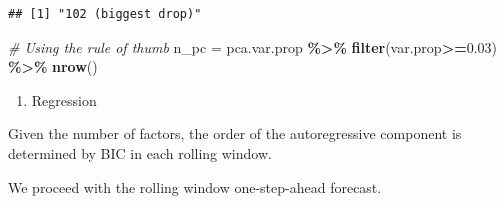 \documentclass[
]{article}
\newenvironment{Shaded}{\begin{snugshade}}{\end{snugshade}}
\newcommand{\AttributeTok}[1]{\textcolor[rgb]{0.13,0.29,0.53}{#1}}
\newcommand{\CommentTok}[1]{\textcolor[rgb]{0.56,0.35,0.01}{\textit{#1}}}
\newcommand{\DecValTok}[1]{\textcolor[rgb]{0.00,0.00,0.81}{#1}}
\newcommand{\FloatTok}[1]{\textcolor[rgb]{0.00,0.00,0.81}{#1}}
\newcommand{\FunctionTok}[1]{\textcolor[rgb]{0.13,0.29,0.53}{\textbf{#1}}}
\newcommand{\NormalTok}[1]{#1}
\newcommand{\OtherTok}[1]{\textcolor[rgb]{0.56,0.35,0.01}{#1}}
\newcommand{\SpecialCharTok}[1]{\textcolor[rgb]{0.81,0.36,0.00}{\textbf{#1}}}
\newcommand{\StringTok}[1]{\textcolor[rgb]{0.31,0.60,0.02}{#1}}
\providecommand{\tightlist}{%
  \setlength{\itemsep}{0pt}\setlength{\parskip}{0pt}}
\begin{document}
\begin{verbatim}
## [1] "102 (biggest drop)"
\end{verbatim}

\begin{Shaded}
\begin{Highlighting}[]
\CommentTok{\# Using the rule of thumb}
\NormalTok{n\_pc }\OtherTok{=}\NormalTok{ pca.var.prop }\SpecialCharTok{\%\textgreater{}\%}
  \FunctionTok{filter}\NormalTok{(var.prop}\SpecialCharTok{\textgreater{}=}\FloatTok{0.03}\NormalTok{) }\SpecialCharTok{\%\textgreater{}\%}
  \FunctionTok{nrow}\NormalTok{()}
\end{Highlighting}
\end{Shaded}

\begin{enumerate}
\def\labelenumi{\arabic{enumi}.}
\setcounter{enumi}{2}
\tightlist
\item
  Regression
\end{enumerate}

Given the number of factors, the order of the autoregressive component
is determined by BIC in each rolling window.

\begin{Shaded}
\end{Shaded}

We proceed with the rolling window one-step-ahead forecast.
\end{document}
